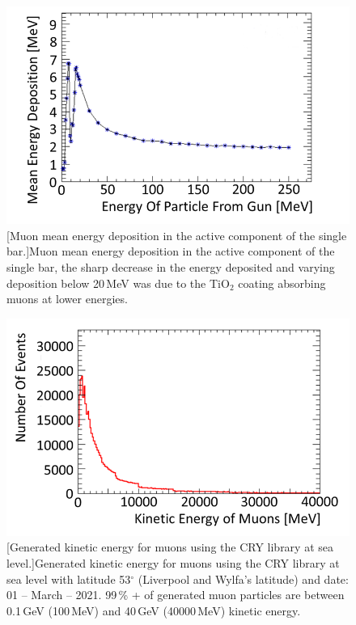 \begin{figure}[!h]
\centering
\begin{minipage}{.45\textwidth}
  \centering
  \includegraphics[width=\linewidth]{Chapter4/Figs/Raster/Muon_TiO2_med_engMedText.png}
  [Muon mean energy deposition in the active component of the single bar.]{Muon mean energy deposition in the active component of the single bar, the sharp decrease in the energy deposited and varying deposition below 20\,MeV was due to the TiO$_2$ coating absorbing muons at lower energies.} 
  \label{fig:muon_0_250}
  \vspace{0.956cm} %
\end{minipage}%
\qquad
\begin{minipage}{.45\textwidth}
  \centering
  \includegraphics[width=\linewidth]{Chapter4/Figs/Raster/keMevCryMuonsMedText.png} 
  [Generated kinetic energy for muons using the CRY library at sea level.]{Generated kinetic energy for muons using the CRY library \cite{ieee_cry_2007} at sea level with latitude 53$^\circ$ (Liverpool and Wylfa's latitude) and date: 01 -- March -- 2021. 99\,\% + of generated muon particles are between 0.1\,GeV (100\,MeV) and 40\,GeV (40000\,MeV) kinetic energy.}
  \label{fig:keMevCryMuons}
\end{minipage}
\end{figure}

